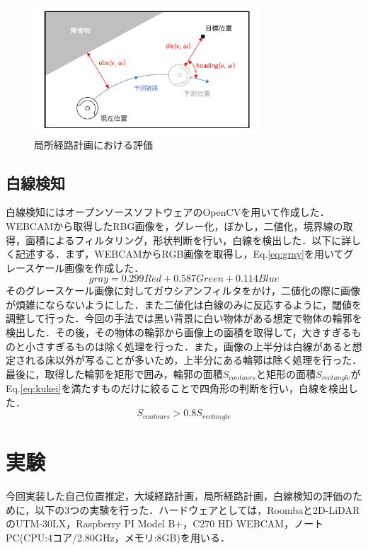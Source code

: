 \documentclass{jarticle}
\renewcommand{\%}{\textsf{\char`\%}}
\begin{document}
\begin{figure}
	\includegraphics[width=8.5cm]{./picture/DWA.png}
	\caption{局所経路計画における評価}
	\label{fig:DWA}
\end{figure}

\subsection{白線検知}
白線検知にはオープンソースソフトウェアのOpenCV\cite{opencv}を用いて作成した．WEBCAMから取得したRBG画像を，グレー化，ぼかし，二値化，境界線の取得，面積によるフィルタリング，形状判断を行い，白線を検出した．以下に詳しく記述する．まず，WEBCAMからRGB画像を取得し，Eq.\ref{eq:gray}を用いてグレースケール画像を作成した．
\begin{equation}
	gray = 0.299Red + 0.587Green + 0.114Blue
	\label{eq:gray}
\end{equation}
そのグレースケール画像に対してガウシアンフィルタをかけ，二値化の際に画像が煩雑にならないようにした．また二値化は白線のみに反応するように，閾値を調整して行った．今回の手法では黒い背景に白い物体がある想定で物体の輪郭を検出した．その後，その物体の輪郭から画像上の面積を取得して，大きすぎるものと小さすぎるものは除く処理を行った．また，画像の上半分は白線があると想定される床以外が写ることが多いため，上半分にある輪郭は除く処理を行った．最後に，取得した輪郭を矩形で囲み，輪郭の面積$S_{contours}$と矩形の面積$S_{rectangle}$がEq.\ref{eq:kukei}を満たすものだけに絞ることで四角形の判断を行い，白線を検出した．
\vspace{-3mm}
\begin{equation}
	S_{contours} > 0.8S_{rectangle}
	\label{eq:kukei}
\end{equation}
\section{実験}
今回実装した自己位置推定，大域経路計画，局所経路計画，白線検知の評価のために，以下の3つの実験を行った．ハードウェアとしては，Roomba\cite{roomba}と2D-LiDARのUTM-30LX\cite{lrf}，Raspberry PI Model B+\cite{raspi}，C270 HD WEBCAM\cite{webcam}，ノートPC(CPU:4コア/2.80GHz，メモリ:8GB)を用いる．
\end{document}
